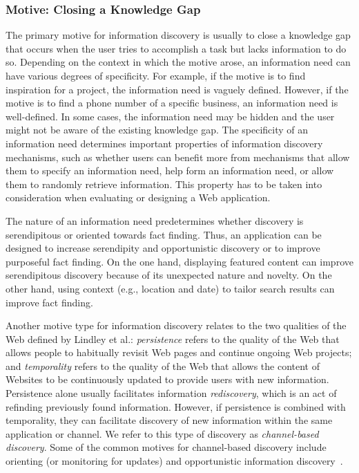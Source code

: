 \documentclass[review]{elsarticle}
\begin{document}
{{{\subsubsection{Motive: Closing a Knowledge Gap}
The primary motive for information discovery is usually to close a knowledge gap that occurs when the user tries to accomplish a task but lacks information to do so. 
Depending on the context in which the motive arose, an information need can have various degrees of specificity. For example, if the motive is to find inspiration for a project, the information need is vaguely defined. However, if the motive is to find a phone number of a specific business, an information need is well-defined. In some cases, the information need may be hidden and the user might not be aware of the existing knowledge gap. The specificity of an information need determines important properties of information discovery mechanisms, such as whether users can benefit more from mechanisms that allow them to specify an information need, help form an information need, or allow them to randomly retrieve information. This property has to be taken into consideration when evaluating or designing a Web application. 

The nature of an information need predetermines whether discovery is 
serendipitous or oriented towards fact finding. Thus, 
an application can be designed to increase serendipity and opportunistic discovery or to improve purposeful fact finding. On the one hand, displaying featured content can improve serendipitous discovery because of its unexpected nature and novelty. On the other hand, using context (e.g., location and date) to tailor search results can improve fact finding. 

Another motive type for information discovery relates to the two qualities of the Web defined by Lindley et al.\cite{lindley2012s}: \textit{persistence} refers to the quality of the Web that allows people to habitually revisit Web pages and continue ongoing Web projects; and \textit{temporality} refers to the quality of the Web that allows the content of Websites to be continuously updated to provide users with new information. Persistence alone usually facilitates information \textit{rediscovery}, which is an act of refinding previously found information. However, if persistence is combined with temporality, they can facilitate discovery of new information within the same application or channel. We refer to this type of discovery as \textit{channel-based discovery}. Some of the common motives for channel-based discovery include orienting (or monitoring for updates) and opportunistic information discovery~\cite{lindley2012s}.          

}}}
\end{document}

